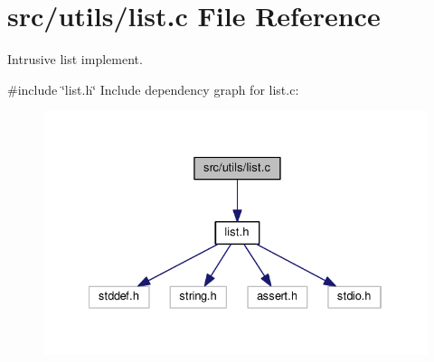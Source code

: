 \section{src/utils/list.c File Reference}
\label{list_8c}


Intrusive list implement.  


{\ttfamily \#include \char`\"{}list.\+h\char`\"{}}\newline
Include dependency graph for list.\+c\+:\nopagebreak
\begin{figure}[H]
\begin{center}
\leavevmode
\includegraphics[width=334pt]{list_8c__incl}
\end{center}
\end{figure}
